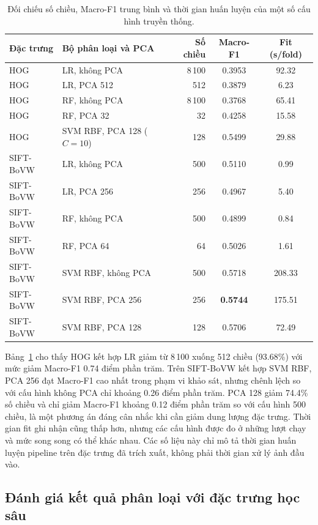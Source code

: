 \begin{table}[H]\centering\caption{Đối chiếu số chiều, Macro-F1 trung bình và thời gian huấn luyện của một số cấu hình truyền thống.}\label{tab:trad-pca-summary}
\small\begin{tabularx}{\linewidth}{@{}lXrcc@{}}\toprule
Đặc trưng & Bộ phân loại và PCA & Số chiều & Macro-F1 & Fit (s/fold)\\\midrule
HOG & LR, không PCA & 8\,100 & 0.3953 & 92.32\\
HOG & LR, PCA 512 & 512 & 0.3879 & 6.23\\
HOG & RF, không PCA & 8\,100 & 0.3768 & 65.41\\
HOG & RF, PCA 32 & 32 & 0.4258 & 15.58\\
HOG & SVM RBF, PCA 128 ($C=10$) & 128 & 0.5499 & 29.88\\\midrule
SIFT-BoVW & LR, không PCA & 500 & 0.5110 & 0.99\\
SIFT-BoVW & LR, PCA 256 & 256 & 0.4967 & 5.40\\
SIFT-BoVW & RF, không PCA & 500 & 0.4899 & 0.84\\
SIFT-BoVW & RF, PCA 64 & 64 & 0.5026 & 1.61\\
SIFT-BoVW & SVM RBF, không PCA & 500 & 0.5718 & 208.33\\
SIFT-BoVW & SVM RBF, PCA 256 & 256 & \textbf{0.5744} & 175.51\\
SIFT-BoVW & SVM RBF, PCA 128 & 128 & 0.5706 & 72.49\\\bottomrule
\end{tabularx}
\end{table}

Bảng~\ref{tab:trad-pca-summary} cho thấy HOG kết hợp LR giảm từ 8\,100 xuống 512 chiều (93.68\%) với mức giảm Macro-F1 0.74 điểm phần trăm. Trên SIFT-BoVW kết hợp SVM RBF, PCA 256 đạt Macro-F1 cao nhất trong phạm vi khảo sát, nhưng chênh lệch so với cấu hình không PCA chỉ khoảng 0.26 điểm phần trăm. PCA 128 giảm 74.4\% số chiều và chỉ giảm Macro-F1 khoảng 0.12 điểm phần trăm so với cấu hình 500 chiều, là một phương án đáng cân nhắc khi cần giảm dung lượng đặc trưng. Thời gian fit ghi nhận cũng thấp hơn, nhưng các cấu hình được đo ở những lượt chạy và mức song song có thể khác nhau. Các số liệu này chỉ mô tả thời gian huấn luyện pipeline trên đặc trưng đã trích xuất, không phải thời gian xử lý ảnh đầu vào.

\subsection{Đánh giá kết quả phân loại với đặc trưng học sâu}
\label{sec:deep}

